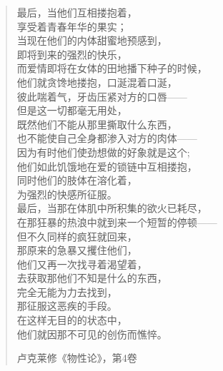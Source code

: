 \thispagestyle{empty}
\null\vfill
\begin{quote}
    
最后，当他们互相搂抱着，\\
享受着青春年华的果实；\\
当现在他们的内体甜蜜地预感到，\\
即将到来的强烈的快乐，\\
而爱情即将在女体的田地播下种子的时候，\\
他们就贪馋地搂抱，口涎混着口涎，\\
彼此喘着气，牙齿压紧对方的口唇——\\
但是这一切都毫无用处，\\
既然他们不能从那里撕取什么东西，\\
也不能使自己全身都渗入对方的肉体——\\
因为有时他们使劲想做的好象就是这个; \\
他们如此饥饿地在爱的锁链中互相搂抱，\\
同时他们的肢体在溶化着，\\
为强烈的快感所征服。\\
最后，当那在体肌中所积集的欲火已耗尽，\\
在那狂暴的热浪中就到来一个短暂的停顿——\\
但不久同样的疯狂就回来，\\
那原来的急暴又攫住他们，\\
他们又再一次找寻着渴望着，\\
去获取那他们不知是什么的东西，\\
完全无能为力去找到，\\
那征服这恶疾的手段。 \\
在这样无目的的状态中，\\
他们就因那不可见的创伤而憔悴。

\hfill 卢克莱修《物性论》，第4卷\vfill

\end{quote}